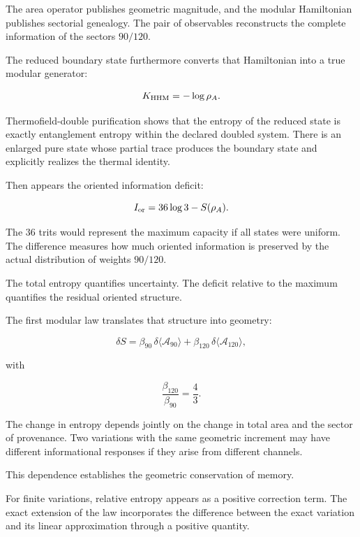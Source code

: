 The area operator publishes geometric magnitude, and the modular Hamiltonian publishes sectorial genealogy. The pair of observables reconstructs the complete information of the sectors \(90/120\).\par

The reduced boundary state furthermore converts that Hamiltonian into a true modular generator:\par

\[
K_{\rm HHM}=-\log\rho_A.
\]

Thermofield-double purification shows that the entropy of the reduced state is exactly entanglement entropy within the declared doubled system. There is an enlarged pure state whose partial trace produces the boundary state and explicitly realizes the thermal identity.\par

Then appears the oriented information deficit:\par

\[
I_{\rm or}
=
36\log3-S(\rho_A).
\]

The \(36\) trits would represent the maximum capacity if all states were uniform. The difference measures how much oriented information is preserved by the actual distribution of weights \(90/120\).\par

The total entropy quantifies uncertainty. The deficit relative to the maximum quantifies the residual oriented structure.\par

The first modular law translates that structure into geometry:\par

\[
\delta S
=
\beta_{90}\,
\delta\langle\mathcal A_{90}\rangle
+
\beta_{120}\,
\delta\langle\mathcal A_{120}\rangle,
\]

with\par

\[
\frac{\beta_{120}}{\beta_{90}}
=
\frac43.
\]

The change in entropy depends jointly on the change in total area and the sector of provenance. Two variations with the same geometric increment may have different informational responses if they arise from different channels.\par

This dependence establishes the geometric conservation of memory.\par

For finite variations, relative entropy appears as a positive correction term. The exact extension of the law incorporates the difference between the exact variation and its linear approximation through a positive quantity.\par

